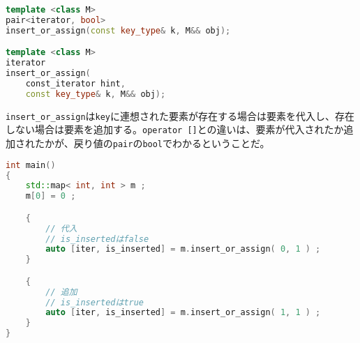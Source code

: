 %

\bgroup
\begin{lstlisting}[language=C++]
template <class M>
pair<iterator, bool>
insert_or_assign(const key_type& k, M&& obj);

template <class M>
iterator
insert_or_assign(
    const_iterator hint,
    const key_type& k, M&& obj);
\end{lstlisting}
\egroup

\lstinline!insert_or_assign!は\lstinline!key!に連想された要素が存在する場合は要素を代入し、存在しない場合は要素を追加する。\lstinline!operator []!との違いは、要素が代入されたか追加されたかが、戻り値の\lstinline!pair!の\lstinline!bool!でわかるということだ。

\begin{lstlisting}[language=C++]
int main()
{
    std::map< int, int > m ;
    m[0] = 0 ;

    {
        // 代入
        // is_insertedはfalse
        auto [iter, is_inserted] = m.insert_or_assign( 0, 1 ) ;
    }

    {
        // 追加
        // is_insertedはtrue
        auto [iter, is_inserted] = m.insert_or_assign( 1, 1 ) ;
    }
}
\end{lstlisting}

